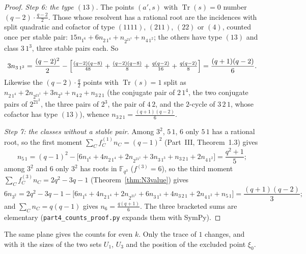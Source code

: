 \documentclass[12pt,a4paper]{amsart}
\theoremstyle{definition}
\newcommand{\F}{\mathbb{F}}
\newcommand{\Tr}{\operatorname{Tr}}
\begin{document}
\begin{proof}
\emph{Step 6: the type $(13)$.} The points $(a',s)$ with $\Tr(s)=0$ number $(q-2)\cdot\frac{q-2}2$. Those whose resolvent has a rational root are the incidences with split quadratic and cofactor of type $(1111)$, $(211)$, $(22)$ or $(4)$, counted once per stable pair: $15n_{1^6}+6n_{2\,1^4}+n_{2^21^2}+n_{4\,1^2}$; the others have type $(13)$ and class $3\,1^3$, three stable pairs each. So
\[
3n_{3\,1^3}=\frac{(q-2)^2}2-\Bigl[\tfrac{(q-2)(q-8)}{48}+\tfrac{(q-2)(q-8)}8+\tfrac{q(q-2)}{16}+\tfrac{q(q-2)}8\Bigr]=\frac{(q+1)(q-2)}6 .
\]
Likewise the $(q-2)\cdot\frac q2$ points with $\Tr(s)=1$ split as $n_{2\,1^4}+2n_{2^21^2}+3n_{2^3}+n_{4\,2}+n_{3\,2\,1}$ (the conjugate pair of $2\,1^4$, the two conjugate pairs of $2^21^2$, the three pairs of $2^3$, the pair of $4\,2$, and the $2$-cycle of $3\,2\,1$, whose cofactor has type $(13)$), whence $n_{3\,2\,1}=\frac{(q+1)(q-2)}6$.

\emph{Step 7: the classes without a stable pair.} Among $3^2$, $5\,1$, $6$ only $5\,1$ has a rational root, so the first moment $\sum_Cf^{(1)}_Cn_C=(q-1)^2$ (Part~III, Theorem~1.3) gives
\[
n_{5\,1}=(q-1)^2-\bigl[6n_{1^6}+4n_{2\,1^4}+2n_{2^21^2}+3n_{3\,1^3}+n_{3\,2\,1}+2n_{4\,1^2}\bigr]=\frac{q^2+1}5 ;
\]
among $3^2$ and $6$ only $3^2$ has roots in $\F_{q^3}$ ($f^{(3)}=6$), so the third moment $\sum_Cf^{(3)}_Cn_C=2q^2-3q-1$ (Theorem~\ref{thm:N3value}) gives
\[
6n_{3^2}=2q^2-3q-1-\bigl[6n_{1^6}+4n_{2\,1^4}+2n_{2^21^2}+6n_{3\,1^3}+4n_{3\,2\,1}+2n_{4\,1^2}+n_{5\,1}\bigr]=\frac{(q+1)(q-2)}3 ;
\]
and $\sum_Cn_C=q(q-1)$ gives $n_6=\frac{q(q+1)}6$. The three bracketed sums are elementary (\texttt{part4\_counts\_proof.py} expands them with SymPy).
\end{proof}

The same plane gives the counts for even $k$. Only the trace of $1$ changes, and with it the sizes of the two sets $U_1$, $U_3$ and the position of the excluded point $\xi_0$.
\end{document}
